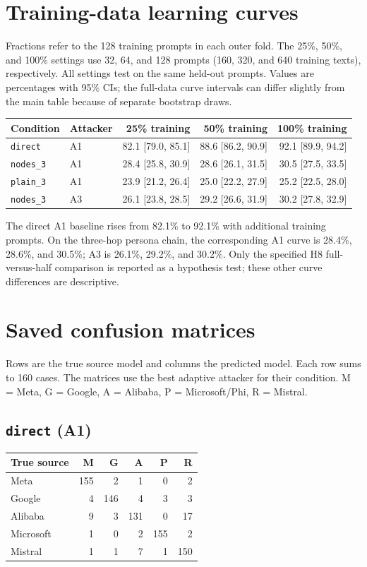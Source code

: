 \documentclass[11pt]{article}
\begin{document}
\section{Training-data learning curves}
Fractions refer to the 128 training prompts in each outer fold. The 25\%,
50\%, and 100\% settings use 32, 64, and 128 prompts (160, 320, and 640
training texts), respectively. All settings test on the same held-out prompts.
Values are percentages with 95\% CIs; the full-data curve intervals can differ
slightly from the main table because of separate bootstrap draws.
\begin{center}
\small
\begin{tabular}{llrrr}
\toprule
Condition & Attacker & 25\% training & 50\% training & 100\% training \\
\midrule
\texttt{direct} & A1 & 82.1 [79.0, 85.1] & 88.6 [86.2, 90.9] & 92.1 [89.9, 94.2] \\
\texttt{nodes\_3} & A1 & 28.4 [25.8, 30.9] & 28.6 [26.1, 31.5] & 30.5 [27.5, 33.5] \\
\texttt{plain\_3} & A1 & 23.9 [21.2, 26.4] & 25.0 [22.2, 27.9] & 25.2 [22.5, 28.0] \\
\texttt{nodes\_3} & A3 & 26.1 [23.8, 28.5] & 29.2 [26.6, 31.9] & 30.2 [27.8, 32.9] \\
\bottomrule
\end{tabular}
\end{center}

The direct A1 baseline rises from 82.1\% to 92.1\% with additional training
prompts. On the three-hop persona chain, the corresponding A1 curve is
28.4\%, 28.6\%, and 30.5\%; A3 is 26.1\%, 29.2\%, and 30.2\%.
Only the specified H8 full-versus-half comparison is reported as a hypothesis
test; these other curve differences are descriptive.

\section{Saved confusion matrices}
Rows are the true source model and columns the predicted model. Each row sums
to 160 cases. The matrices use the best adaptive attacker for their condition.
M = Meta, G = Google, A = Alibaba, P = Microsoft/Phi, R = Mistral.
\subsection*{\texttt{direct} (A1)}
\begin{center}
\small
\begin{tabular}{lrrrrr}
\toprule
True source & M & G & A & P & R \\
\midrule
Meta & 155 & 2 & 1 & 0 & 2 \\
Google & 4 & 146 & 4 & 3 & 3 \\
Alibaba & 9 & 3 & 131 & 0 & 17 \\
Microsoft & 1 & 0 & 2 & 155 & 2 \\
Mistral & 1 & 1 & 7 & 1 & 150 \\
\bottomrule
\end{tabular}
\end{center}
\end{document}
